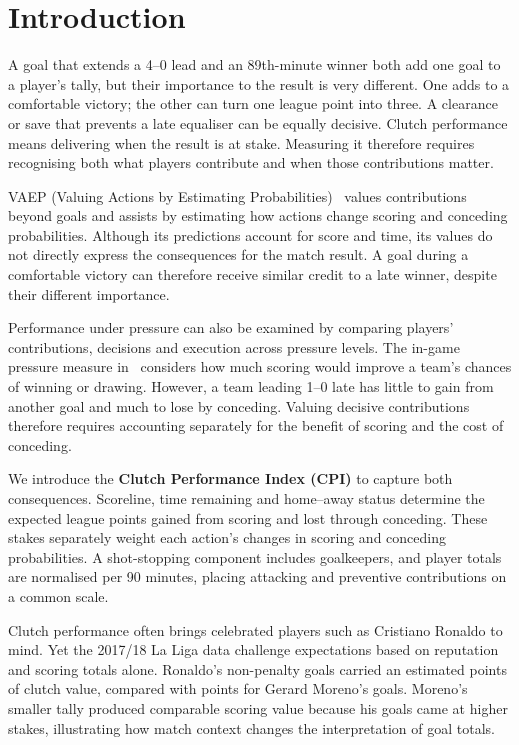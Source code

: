 \documentclass[runningheads]{llncs}
\begin{document}
\section{Introduction}
 A goal that extends a 4--0 lead and an 89th-minute winner both add one goal to a player's tally, but their importance to the result is very different. One adds to a comfortable victory; the other can turn one league point into three. A clearance or save that prevents a late equaliser can be equally decisive. Clutch performance means delivering when the result is at stake. Measuring it therefore requires recognising both what players contribute and when those contributions matter.

 VAEP (Valuing Actions by Estimating Probabilities)~\cite{decroos2019} values contributions beyond goals and assists by estimating how actions change scoring and conceding probabilities. Although its predictions account for score and time, its values do not directly express the consequences for the match result. A goal during a comfortable victory can therefore receive similar credit to a late winner, despite their different importance.

 Performance under pressure can also be examined by comparing players' contributions, decisions and execution across pressure levels. The in-game pressure measure in~\cite{bransen2019} considers how much scoring would improve a team's chances of winning or drawing. However, a team leading 1--0 late has little to gain from another goal and much to lose by conceding. Valuing decisive contributions therefore requires accounting separately for the benefit of scoring and the cost of conceding.

 We introduce the \textbf{Clutch Performance Index (CPI)} to capture both consequences. Scoreline, time remaining and home--away status determine the expected league points gained from scoring and lost through conceding. These stakes separately weight each action's changes in scoring and conceding probabilities. A shot-stopping component includes goalkeepers, and player totals are normalised per 90 minutes, placing attacking and preventive contributions on a common scale.

 Clutch performance often brings celebrated players such as Cristiano Ronaldo to mind. Yet the 2017/18 La Liga data challenge expectations based on reputation and scoring totals alone. Ronaldo's \goalsRonaldo{} non-penalty goals carried an estimated \gptsRonaldo{} points of clutch value, compared with \gptsMoreno{} points for Gerard Moreno's \goalsMoreno{} goals. Moreno's smaller tally produced comparable scoring value because his goals came at higher stakes, illustrating how match context changes the interpretation of goal totals.
\end{document}
